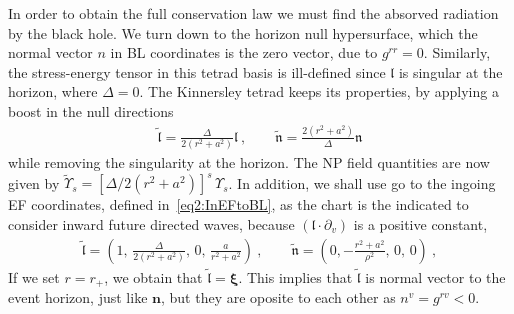 In order to obtain the full conservation law we must find the absorved radiation by the black hole. We turn down to the horizon null hypersurface, which the normal vector $n$ in BL coordinates is the zero vector, due to $g^{rr}=0$.
Similarly, the stress-energy tensor in this tetrad basis is ill-defined since $\mathfrak{l}$ is singular at the horizon, where $\Delta=0$.
The Kinnersley tetrad keeps its properties, by applying a boost in the null directions
\begin{align}
   \bm{\tilde{\mathfrak{l}}} = \frac{\Delta}{2 (r^2+a^2)} \bm{\mathfrak{l}} ~,\qquad \bm{\tilde{\mathfrak{n}}} = \frac{2 (r^2+a^2)}{\Delta} \bm{\mathfrak{n}}
\end{align}
while removing the singularity at the horizon. The NP field quantities are now given by $\tilde{\Upsilon}_s = [\Delta/2(r^2+a^2)]^s \,\Upsilon_s$.
In addition, we shall use go to the ingoing EF coordinates, defined in~\eqref{eq2:InEFtoBL}, as the chart is the indicated to consider inward future directed waves, because $(\bm{\mathfrak{l}}\cdot\partial_v)$ is a positive constant,
\begin{align}
    \bm{\tilde{\mathfrak{l}}} = \left(1, \,\frac{\Delta}{2(r^2+a^2)}, \,0, \,\frac{a}{r^2 + a^2} \right) ~,\qquad \bm{\tilde{\mathfrak{n}}} = \left(0, -\frac{r^2+a^2}{\rho^2}, \,0, \,0\right) ~,
\end{align}
If we set $r=r_{+}$, we obtain that $\bm{\tilde{\mathfrak{l}}} = \bm{\xi}$.
This implies that $\bm{\tilde{\mathfrak{l}}}$ is normal vector to the event horizon, just like $\bm{n}$, but they are oposite to each other as $n^v = g^{rv}<0$.

